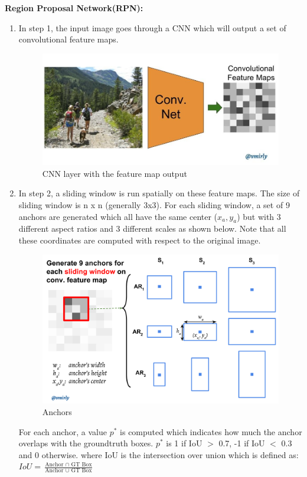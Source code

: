 \documentclass[12pt]{article}
\begin{document}
\textbf{Region Proposal Network(RPN): }
\begin{enumerate}
	\item In step 1, the input image goes through a CNN which will output a set of convolutional feature maps. \begin{figure}[H]
\centering
  \includegraphics[width=0.5\linewidth]{./Images/RPN1.jpeg}
  \caption{CNN layer with the feature map output}
  \label{fig:RPN1}
\end{figure}
	
	\item In step 2, a sliding window is run spatially on these feature maps. The size of sliding window is n x n (generally 3x3). For each sliding window, a set of 9 anchors are generated which all have the same center ($x_a,y_a$) but with 3 different aspect ratios and 3 different scales as shown below. Note that all these coordinates are computed with respect to the original image.
\begin{figure}[H]
\centering
  \includegraphics[width=0.5\linewidth]{./Images/RPN2.png}
  \caption{Anchors}
  \label{fig:RPN2}
\end{figure}

For each anchor, a value $p^*$ is computed which indicates how much the anchor overlaps with the groundtruth boxes. $p^*$ is 1 if IoU $>$ 0.7, -1 if IoU $<$ 0.3 and 0 otherwise.
where IoU is the intersection over union which is defined as: $IoU = \frac{\text{Anchor $\cap$ GT Box}}{\text{Anchor $\cup$ GT Box}}$ 


\end{enumerate}
\end{document}
